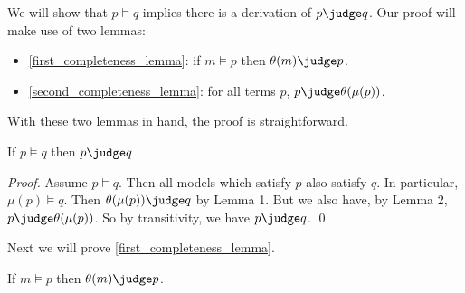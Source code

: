 We will show that $p \models q$ implies there is a derivation of $p \judge q$.
Our proof will make use of two lemmas:
\begin{itemize}
\item
 \ref{first_completeness_lemma}: if $m \models p$ then $\theta(m) \judge p$.
\item
\ref{second_completeness_lemma}: for all terms $p$, $p \judge \theta(\mu(p))$.
\end{itemize}
With these two lemmas in hand, the proof is straightforward.
\begin{theorem}
If $p \models q$ then $p \judge q$
\end{theorem}
\begin{proof}
Assume $p \models q$. 
Then all models which satisfy $p$ also satisfy $q$.
In particular, $\mu(p) \models q$.
Then $\theta(\mu(p)) \judge q$ by Lemma 1.
But we also have, by Lemma 2, $p \judge \theta(\mu(p)) $.
So by transitivity, we have $p \judge q$.
\qed
\end{proof}
Next we will prove \ref{first_completeness_lemma}.
\begin{lemma}
\label{first_completeness_lemma}
If $m \models p$ then $\theta(m) \judge p$.
\end{lemma}
